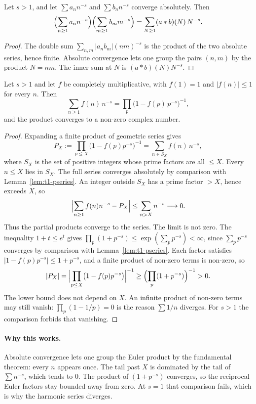 \begin{lemma}\label{lem:t1-dseries}
Let $s>1$, and let $\sum a_nn^{-s}$ and $\sum b_nn^{-s}$ converge absolutely. Then
\[
\Bigl(\sum_{n\ge1}a_nn^{-s}\Bigr)\Bigl(\sum_{m\ge1}b_mm^{-s}\Bigr)
=\sum_{N\ge1}(a*b)(N)\,N^{-s}.
\]
\end{lemma}
\begin{proof}
The double sum $\sum_{n,m}|a_nb_m|(nm)^{-s}$ is the product of the two absolute series, hence finite. Absolute convergence lets one group the pairs $(n,m)$ by the product $N=nm$. The inner sum at $N$ is $(a*b)(N)N^{-s}$.
\end{proof}

\begin{theorem}\label{thm:t1-eulerprod}
Let $s>1$ and let $f$ be completely multiplicative, with $f(1)=1$ and $|f(n)|\le1$ for every $n$. Then
\[
\sum_{n\ge1}f(n)\,n^{-s}=\prod_p\bigl(1-f(p)\,p^{-s}\bigr)^{-1},
\]
and the product converges to a non-zero complex number.
\end{theorem}
\begin{proof}
Expanding a finite product of geometric series gives
\[
P_X:=\prod_{p\le X}\bigl(1-f(p)p^{-s}\bigr)^{-1}
=\sum_{n\in S_X}f(n)\,n^{-s},
\]
where $S_X$ is the set of positive integers whose prime factors are all $\le X$. Every $n\le X$ lies in $S_X$. The full series converges absolutely by comparison with Lemma~\ref{lem:t1-pseries}. An integer outside $S_X$ has a prime factor $>X$, hence exceeds $X$, so
\[
\Bigl|\sum_{n\ge1}f(n)n^{-s}-P_X\Bigr|
\le\sum_{n>X}n^{-s}\longrightarrow0.
\]
Thus the partial products converge to the series. The limit is not zero. The inequality $1+t\le e^t$ gives $\prod_p(1+p^{-s})\le\exp(\sum_pp^{-s})<\infty$, since $\sum_pp^{-s}$ converges by comparison with Lemma~\ref{lem:t1-pseries}. Each factor satisfies $|1-f(p)p^{-s}|\le1+p^{-s}$, and a finite product of non-zero terms is non-zero, so
\[
|P_X|=\Bigl|\prod_{p\le X}\bigl(1-f(p)p^{-s}\bigr)\Bigr|^{-1}
\ge\Bigl(\prod_p(1+p^{-s})\Bigr)^{-1}>0.
\]
The lower bound does not depend on $X$. An infinite product of non-zero terms may still vanish: $\prod_p(1-1/p)=0$ is the reason $\sum 1/n$ diverges. For $s>1$ the comparison forbids that vanishing.
\end{proof}

\paragraph{Why this works.}
Absolute convergence lets one group the Euler product by the fundamental theorem: every $n$ appears once. The tail past $X$ is dominated by the tail of $\sum n^{-s}$, which tends to $0$. The product of $(1+p^{-s})$ converges, so the reciprocal Euler factors stay bounded away from zero. At $s=1$ that comparison fails, which is why the harmonic series diverges.

